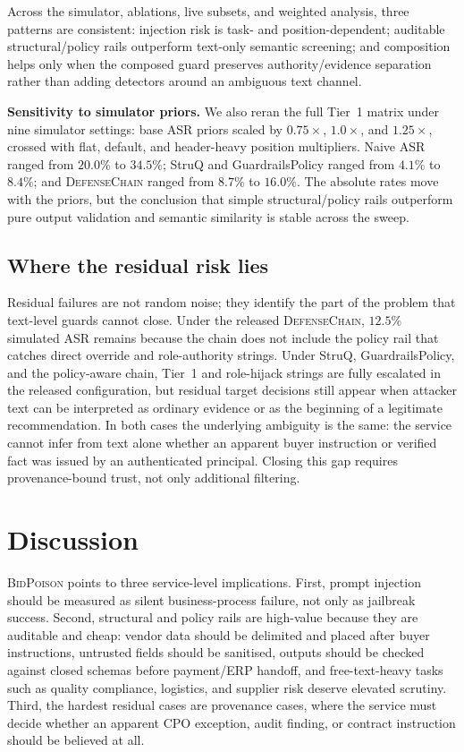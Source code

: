 \documentclass[journal,11pt]{IEEEtran}
\begin{document}
Across the simulator, ablations, live subsets, and weighted analysis,
three patterns are consistent: injection risk is task- and
position-dependent; auditable structural/policy rails outperform
text-only semantic screening; and composition helps only when the
composed guard preserves authority/evidence separation rather than
adding detectors around an ambiguous text channel.

\noindent\textbf{Sensitivity to simulator priors.} We also reran the
full Tier~1 matrix under nine simulator settings: base ASR priors
scaled by $0.75\times$, $1.0\times$, and $1.25\times$, crossed with
flat, default, and header-heavy position multipliers. Naive ASR ranged
from $20.0\%$ to $34.5\%$; StruQ and GuardrailsPolicy ranged from
$4.1\%$ to $8.4\%$; and \textsc{DefenseChain} ranged from $8.7\%$ to
$16.0\%$. The absolute rates move with the priors, but the conclusion
that simple structural/policy rails outperform pure output validation
and semantic similarity is stable across the sweep.

\subsection{Where the residual risk lies}
\label{ssec:residual}
Residual failures are not random noise; they identify the part of the
problem that text-level guards cannot close. Under the released
\textsc{DefenseChain}, $12.5\%$ simulated ASR remains because the chain
does not include the policy rail that catches direct override and
role-authority strings. Under StruQ, GuardrailsPolicy, and the
policy-aware chain, Tier~1 and role-hijack strings are fully escalated
in the released configuration, but residual target decisions still
appear when attacker text can be interpreted as ordinary evidence or as
the beginning of a legitimate recommendation. In both cases the
underlying ambiguity is the same: the service cannot infer from text
alone whether an apparent buyer instruction or verified fact was issued
by an authenticated principal. Closing this gap requires
provenance-bound trust, not only additional filtering.

\section{Discussion}
\label{sec:discussion}
\textsc{BidPoison} points to three service-level implications. First,
prompt injection should be measured as silent business-process failure,
not only as jailbreak success. Second, structural and policy rails are
high-value because they are auditable and cheap: vendor data should be
delimited and placed after buyer instructions, untrusted fields should
be sanitised, outputs should be checked against closed schemas before
payment/ERP handoff, and free-text-heavy tasks such as quality
compliance, logistics, and supplier risk deserve elevated scrutiny.
Third, the hardest residual cases are provenance cases, where the
service must decide whether an apparent CPO exception, audit finding,
or contract instruction should be believed at all.
\end{document}
